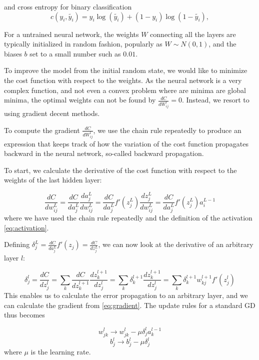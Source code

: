 and cross entropy for binary classification
\begin{equation}\label{eq:square_loss}
    c(y_i, \tilde{y_i}) = y_i\log(\tilde{y_i}) + (1 - y_i)\log(1 - \tilde{y_i}),
\end{equation}

For a untrained neural network, the weights $W$ connecting all the layers are typically initialized in random fashion, popularly as $W \sim N(0,1)$, and the biases $b$ set to a small number such as $0.01$. 

To improve the model from the initial random state, we would like to minimize the cost function with respect to the weights. As the neural network is a very complex function, and not even a convex problem where are minima are global minima, the optimal weights can not be found by $\frac{dC}{dW^l_{ij}} = 0$. Instead, we resort to using gradient decent methods.

To compute the gradient $\frac{dC}{dW^l_{ij}}$, we use the chain rule repeatedly to produce an expression that keeps track of how the variation of the cost function propagates backward in the neural network, so-called backward propagation.

To start, we calculate the derivative of the cost function with respect to the weights of the last hidden layer:

\begin{equation}\label{eq:gradient}
    \frac{dC}{dw^L_{ij}} = \frac{dC}{da_j^L} \frac{da_j^L}{dw^L_{ij}} 
    = \frac{dC}{da_j^L} f'(z_j^L) \frac{dz^L_j}{dw^L_{ij}} = \frac{dC}{da_j^L} f'(z_j^L) a^{L-1}_i
\end{equation}
where we have used the chain rule repeatedly and the definition of the activation \autoref{eq:activation}.

Defining $\delta_j^L = \frac{dC}{da_j^L} f'(z_j) = \frac{dC}{dz_j^L}$, we can now look at the derivative of an arbitrary layer $l$:

\begin{equation}\label{eq:Backward}
   \delta_j^l = \frac{dC}{dz^l_j} = \sum_k \frac{dC}{dz^{l+1}_k} \frac{dz^{l+1}_k}{dz^{l}_j} = \sum_k \delta_k^{l+1} \frac{dz^{l+1}_k}{dz^{l}_j}
   = \sum_k \delta_k^{l+1} w_{kj}^{l+1}f'(z^l_j)
\end{equation}
This enables us to calculate the error propagation to an arbitrary layer, and we can calculate the gradient from \autoref{eq:gradient}. The update rules for a standard GD thus becomes

\begin{equation}\label{eq:grad step}
    w^l_{jk} \rightarrow w^l_{jk} - \mu \delta_j^l a_k^{l-1}  
\end{equation}
\begin{equation*}\label{}
    b^l_{j} \rightarrow b^l_{j} - \mu \delta_j^l 
\end{equation*}
where $\mu$ is the learning rate.

